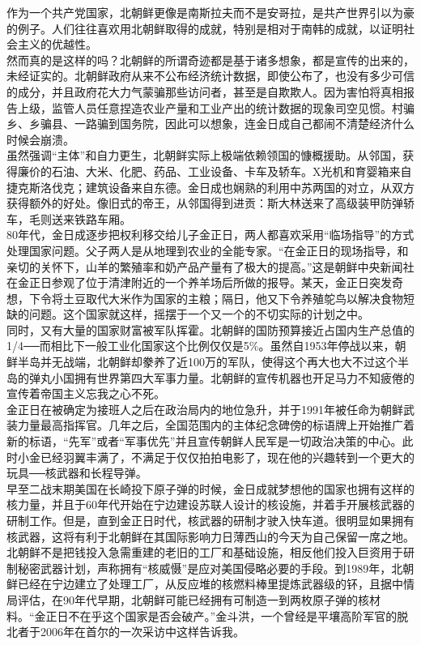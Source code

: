 作为一个共产党国家，北朝鲜更像是南斯拉夫而不是安哥拉，是共产世界引以为豪的例子。人们往往喜欢用北朝鲜取得的成就，特别是相对于南韩的成就，以证明社会主义的优越性。\\

然而真的是这样的吗？北朝鲜的所谓奇迹都是基于诸多想象，都是宣传的出来的，未经证实的。北朝鲜政府从来不公布经济统计数据，即使公布了，也没有多少可信的成分，并且政府花大力气蒙骗那些访问者，甚至是自欺欺人。因为害怕将真相报告上级，监管人员任意捏造农业产量和工业产出的统计数据的现象司空见惯。村骗乡、乡骗县、一路骗到国务院，因此可以想象，连金日成自己都闹不清楚经济什么时候会崩溃。\\

虽然强调“主体”和自力更生，北朝鲜实际上极端依赖领国的慷概援助。从邻国，获得廉价的石油、大米、化肥、药品、工业设备、卡车及轿车。X光机和育婴箱来自捷克斯洛伐克；建筑设备来自东德。金日成也娴熟的利用中苏两国的对立，从双方获得额外的好处。像旧式的帝王，从邻国得到进贡：斯大林送来了高级装甲防弹轿车，毛则送来铁路车厢。\\

80年代，金日成逐步把权利移交给儿子金正日，两人都喜欢采用“临场指导”的方式处理国家问题。父子两人是从地理到农业的全能专家。“在金正日的现场指导，和亲切的关怀下，山羊的繁殖率和奶产品产量有了极大的提高。”这是朝鲜中央新闻社在金正日参观了位于清津附近的一个养羊场后所做的报导。某天，金正日突发奇想，下令将土豆取代大米作为国家的主粮；隔日，他又下令养殖鸵鸟以解决食物短缺的问题。这个国家就这样，摇摆于一个又一个的不切实际的计划之中。\\

同时，又有大量的国家财富被军队挥霍。北朝鲜的国防预算接近占国内生产总值的1/4──而相比下一般工业化国家这个比例仅仅是5\%。虽然自1953年停战以来，朝鲜半岛并无战端，北朝鲜却豢养了近100万的军队，使得这个再大也大不过这个半岛的弹丸小国拥有世界第四大军事力量。北朝鲜的宣传机器也开足马力不知疲倦的宣传着帝国主义忘我之心不死。\\

金正日在被确定为接班人之后在政治局内的地位急升，并于1991年被任命为朝鲜武装力量最高指挥官。几年之后，全国范围内的主体纪念碑傍的标语牌上开始推广着新的标语，“先军”或者“军事优先”并且宣传朝鲜人民军是一切政治决策的中心。此时小金已经羽翼丰满了，不满足于仅仅拍拍电影了，现在他的兴趣转到一个更大的玩具──核武器和长程导弹。\\

早至二战末期美国在长崎投下原子弹的时候，金日成就梦想他的国家也拥有这样的核力量，并且于60年代开始在宁边建设苏联人设计的核设施，并着手开展核武器的研制工作。但是，直到金正日时代，核武器的研制才驶入快车道。很明显如果拥有核武器，这将有利于北朝鲜在其国际影响力日薄西山的今天为自己保留一席之地。北朝鲜不是把钱投入急需重建的老旧的工厂和基础设施，相反他们投入巨资用于研制秘密武器计划，声称拥有“核威慑”是应对美国侵略必要的手段。到1989年，北朝鲜已经在宁边建立了处理工厂，从反应堆的核燃料棒里提炼武器级的钚，且据中情局评估，在90年代早期，北朝鲜可能已经拥有可制造一到两枚原子弹的核材料。“金正日不在乎这个国家是否会破产。”金斗洪，一个曾经是平壤高阶军官的脱北者于2006年在首尔的一次采访中这样告诉我。\\

